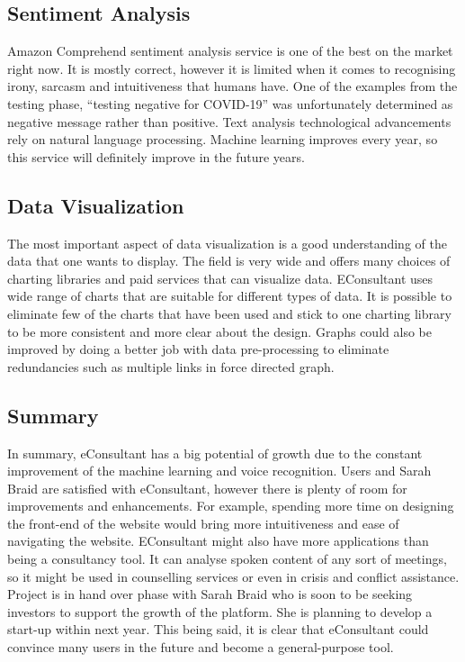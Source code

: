 \documentclass{article}
\begin{document}
\subsection{Sentiment Analysis}
{\large 
Amazon Comprehend sentiment analysis service is one of the best on the market right now. It is mostly correct, however it is limited when it comes to recognising irony, sarcasm and intuitiveness that humans have. One of the examples from the testing phase, ``testing negative for COVID-19'' was unfortunately determined as negative message rather than positive. Text analysis technological advancements rely on natural language processing. Machine learning improves every year, so this service will definitely improve in the future years.\par
}

\subsection{Data Visualization}
{\large 
The most important aspect of data visualization is a good understanding of the data that one wants to display. The field is very wide and offers many choices of charting libraries and paid services that can visualize data. EConsultant uses wide range of charts that are suitable for different types of data. It is possible to eliminate few of the charts that have been used and stick to one charting library to be more consistent and more clear about the design. Graphs could also be improved by doing a better job with data pre-processing to eliminate redundancies such as multiple links in force directed graph.\par
}

\subsection{Summary}
{\large 
In summary, eConsultant has a big potential of growth due to the constant improvement of the machine learning and voice recognition. Users and Sarah Braid are satisfied with eConsultant, however there is plenty of room for improvements and enhancements. For example, spending more time on designing the front-end of the website would bring more intuitiveness and ease of navigating the website. EConsultant might also have more applications than being a consultancy tool. It can analyse spoken content of any sort of meetings, so it might be used in counselling services or even in crisis and conflict assistance. Project is in hand over phase with Sarah Braid who is soon to be seeking investors to support the growth of the platform. She is planning to develop a start-up within next year. This being said, it is clear that eConsultant could convince many users in the future and become a general-purpose tool.\par
}
\end{document}
